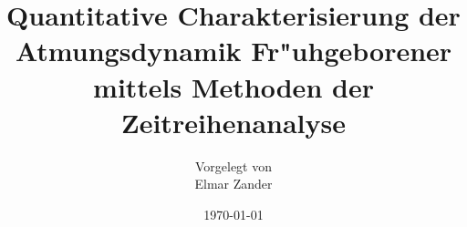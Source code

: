 \documentclass[a4paper,11pt]{scrreprt}
\def\frontmatter{}
\def\mainmatter{}
\def\backmatter{}
\begin{document}

\frontmatter

\titlepage
\subject{Diplomarbeit angefertigt am Institut f"ur Theoretische Physik
I\\Wilhelm-Klemm-Str.\  9}
\title{Quantitative Charakterisierung der Atmungsdynamik Fr"uhgeborener mittels Methoden
der Zeitreihenanalyse}
\author{Vorgelegt von \\ Elmar Zander}
\date{\today}

\maketitle

\tableofcontents



\mainmatter












\backmatter

\begin{appendix}

\end{appendix}



\newpage
{}

%
%

\end{document}
